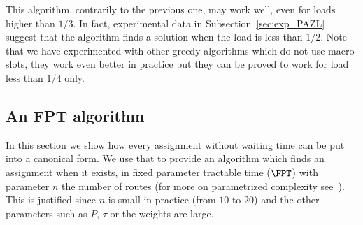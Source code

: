 \documentclass[10pt, conference, letterpaper]{IEEEtran}
\begin{document}
% 
% 
% 
	
This algorithm, contrarily to the previous one, may work well, even for loads higher than $1/3$.
In fact, experimental data in Subsection~\ref{sec:exp_PAZL} suggest that the algorithm finds a solution when the load is less than $1/2$. Note that we have experimented with other greedy algorithms which do not use macro-slots, they work even better in practice but they can be proved to work for load less than $1/4$ only.

\subsection{An FPT algorithm}

In this section we show how every assignment without waiting time can be put into a canonical form.
We use that to provide an algorithm which finds an assignment when it exists, in fixed parameter tractable time ($\FPT$) with parameter $n$ the number of routes (for more on parametrized complexity see~\cite{downey2012parameterized}). This is justified since $n$ is small in practice (from $10$ to $20$) and the other parameters such as $P$, $\tau$ or the weights are large.
\end{document}
